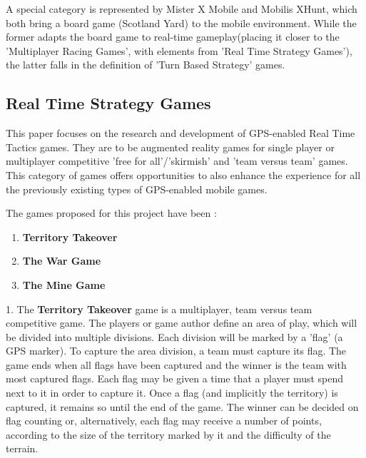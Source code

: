 \documentclass{article}
\begin{document}
A special category is represented by Mister X Mobile and Mobilis XHunt, which
both bring a board game (Scotland Yard) to the mobile environment. While the
former adapts the board game to real-time gameplay(placing it closer to the
'Multiplayer Racing Games', with elements from 'Real Time Strategy Games'), the
latter falls in the definition of 'Turn Based Strategy' games.

\subsection{Real Time Strategy Games}

This paper focuses on the research and development of GPS-enabled Real
Time Tactics games. They are to be augmented reality games for single player or
multiplayer competitive 'free for all'/'skirmish' and 'team versus team'
games. This category of games offers opportunities to also enhance the
experience for all the previously existing types of GPS-enabled mobile games.

The games proposed for this project have been :
\begin{enumerate}	
	\item \textbf{Territory Takeover}
	\item \textbf{The War Game}
	\item \textbf{The Mine Game}
\end{enumerate}

1. The \textbf{Territory Takeover} game is a multiplayer, team versus team
competitive game. The players or game author define an area of play, which will
be divided into multiple divisions. Each division will be marked by a 'flag' (a
GPS marker). To capture the area division, a team must capture its flag. The
game ends when all flags have been captured and the winner is the team with most
captured flags. Each flag may be given a time that a player must spend next to
it in order to capture it. Once a flag (and implicitly the territory) is
captured, it remains so until the end of the game. The winner can be decided on
flag counting or, alternatively, each flag may receive a number of points,
according to the size of the territory marked by it and the difficulty of the
terrain. \newline
\end{document}
